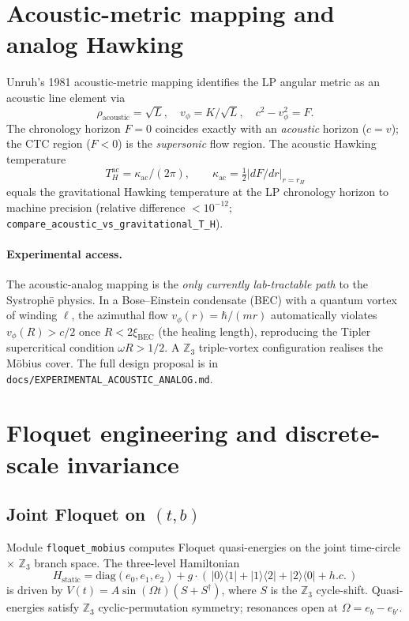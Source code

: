 \documentclass[11pt,a4paper]{article}
\begin{document}
\section{Acoustic-metric mapping and analog Hawking}

Unruh's 1981 acoustic-metric mapping identifies the LP angular
metric as an acoustic line element via
\begin{equation}
\rho_{\text{acoustic}} = \sqrt{L},\quad
v_\phi = K/\sqrt{L},\quad
c^2 - v_\phi^2 = F.
\end{equation}
The chronology horizon $F = 0$ coincides exactly with an
\emph{acoustic} horizon ($c = v$); the CTC region ($F < 0$) is the
\emph{supersonic} flow region. The acoustic Hawking temperature
\begin{equation}
T_H^{\text{ac}} = \kappa_{\text{ac}} / (2\pi),\qquad
\kappa_{\text{ac}} = \tfrac{1}{2} |dF/dr|_{r=r_H}
\end{equation}
equals the gravitational Hawking temperature at the LP chronology
horizon to machine precision (relative difference $< 10^{-12}$;
\texttt{compare\_acoustic\_vs\_gravitational\_T\_H}).

\paragraph{Experimental access.} The acoustic-analog mapping is the
\emph{only currently lab-tractable path} to the Systroph\=e physics.
In a Bose--Einstein condensate (BEC) with a quantum vortex of
winding $\ell$, the azimuthal flow $v_\phi(r) = \hbar / (m r)$
automatically violates $v_\phi(R) > c/2$ once $R < 2 \xi_{\text{BEC}}$
(the healing length), reproducing the Tipler supercritical
condition $\omega R > 1/2$. A $\mathbb{Z}_3$ triple-vortex
configuration realises the M\"obius cover. The full design
proposal is in \texttt{docs/EXPERIMENTAL\_ACOUSTIC\_ANALOG.md}.

\section{Floquet engineering and discrete-scale invariance}

\subsection{Joint Floquet on $(t, b)$}

Module \texttt{floquet\_mobius} computes Floquet quasi-energies on
the joint time-circle $\times$ $\mathbb{Z}_3$ branch space. The
three-level Hamiltonian
\begin{equation}
H_{\text{static}} = \text{diag}(e_0, e_1, e_2)
  + g \cdot (\,|0\rangle\langle 1| + |1\rangle\langle 2| + |2\rangle\langle 0| + h.c.\,)
\end{equation}
is driven by $V(t) = A \sin(\Omega t) (S + S^\dagger)$, where $S$
is the $\mathbb{Z}_3$ cycle-shift. Quasi-energies satisfy
$\mathbb{Z}_3$ cyclic-permutation symmetry; resonances open at
$\Omega = e_b - e_{b'}$.
\end{document}
